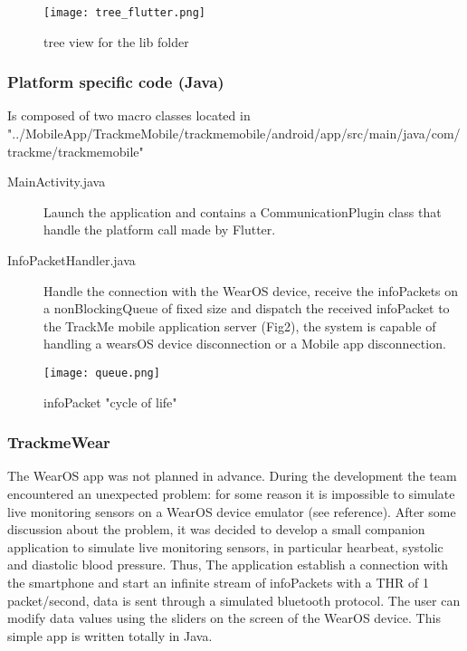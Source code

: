 \documentclass[../main.tex]{subfiles}
\begin{document}
	\begin{figure}[H]
		\centering
		\texttt{[image: tree\_flutter.png]}
		\caption{tree view for the lib folder}
		\label{fig:lib_tree.png}
	\end{figure}

\subsubsection{Platform specific code (Java)}
Is composed of two macro classes located in \\ "../MobileApp/TrackmeMobile/trackmemobile/android/app/src/main/java/com/trackme/trackmemobile"
\begin{description}
	\item[MainActivity.java] Launch the application and contains a CommunicationPlugin class that handle the platform call made by Flutter.
	\item[InfoPacketHandler.java] Handle the connection with the WearOS device, receive the infoPackets on a nonBlockingQueue of fixed size
	 and dispatch the received infoPacket to the TrackMe mobile application server (Fig2), the system is capable of handling a wearsOS device disconnection
	 or a Mobile app disconnection. 
\end{description}

\begin{figure}[H]
	\centering
	\texttt{[image: queue.png]}
	\caption{infoPacket "cycle of life"}
	\label{fig:infopacketscycle.png}
\end{figure}

\subsubsection{TrackmeWear}
The WearOS app was not planned in advance. During the development the team encountered an unexpected problem: for some reason it is impossible to simulate live monitoring sensors on a WearOS device emulator (see reference).
After some discussion about the problem, it was decided to develop a small companion application to simulate live monitoring sensors, in particular hearbeat, systolic and diastolic blood pressure.
Thus, The application establish a connection with the smartphone and start an infinite stream of infoPackets with a THR of 1 packet/second, data is sent through a simulated bluetooth protocol. The user can modify data values using the sliders on the screen of the
WearOS device. This simple app is written totally in Java.
\end{document}
